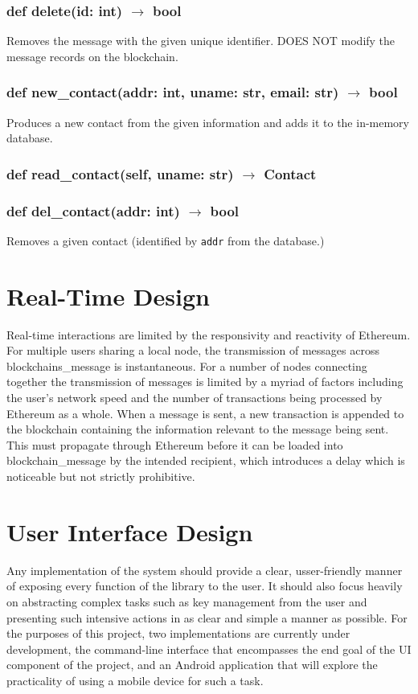 \documentclass[titlepage]{report}
\begin{document}
\subsubsection{def delete(id: int) $\rightarrow$ bool}
Removes the message with the given unique identifier. DOES NOT modify the message records on the \gls{blockchain}.
\subsubsection{def new\_contact(addr: int, uname: str, email: str) $\rightarrow$ bool}
Produces a new contact from the given information and adds it to the in-memory database.
\subsubsection{def read\_contact(self, uname: str) $\rightarrow$ Contact}
\subsubsection{def del\_contact(addr: int) $\rightarrow$ bool}
Removes a given contact (identified by \texttt{addr} from the database.)

\section{Real-Time Design}
Real-time interactions are limited by the responsivity and reactivity of \gls{Ethereum}. For multiple users sharing a local node, the transmission of messages across blockchains\_message is instantaneous. For a number of nodes connecting together the transmission of messages is limited by a myriad of factors including the user's network speed and the number of transactions being processed by \gls{Ethereum} as a whole. When a message is sent, a new transaction is appended to the \gls{blockchain} containing the information relevant to the message being sent. This must propagate through \gls{Ethereum} before it can be loaded into blockchain\_message by the intended recipient, which introduces a delay which is noticeable but not strictly prohibitive.

\section{User Interface Design}
Any implementation of the system should provide a clear, usser-friendly manner of exposing every function of the library to the user. It should also focus heavily on abstracting complex tasks such as key management from the user and presenting such intensive actions in as clear and simple a manner as possible. For the purposes of this project, two implementations are currently under development, the command-line interface that encompasses the end goal of the UI component of the project, and an Android application that will explore the practicality of using a mobile device for such a task.
\end{document}
